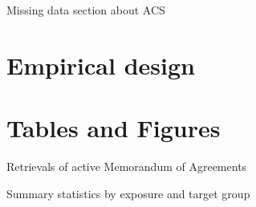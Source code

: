 \documentclass{article}
\begin{document}
Missing data section about ACS

\section{Empirical design}

\begin{comment}

in migration: previous year is different from the current year
\begin{equation}
    in-migration_{icy} = \beta_{0} + \beta_{1}exposure_{cy}*targeted_{i} +  \beta_{2}exposure_{cy} + \beta_{3}targeted_{i} + \beta_{42}W_{y} + \beta_{53}Z_{c} + \epsilon_{cy} 
\end{equation}

out migration 
\begin{equation}
    out-migration_{ic'y'} = \beta'_{0} + \beta'_{1}exposure_{c'y'}*targeted_{i} + \beta'_{2}exposure_{c'y'} + \beta'_{3}targeted_{i} + \beta'_{42}W_{y'} + \beta'_{43}Z_{c'} + \epsilon_{c'y'} 
\end{equation}
\end{comment}

\newpage


\newpage
\section{Tables and Figures}

\begin{table}[H]
\centering
\caption{Retrievals of active Memorandum of Agreements}
\label{tab:retrievals}
\end{table}

\newpage
\begin{table}[H]
\centering
\caption{Summary statistics by exposure and target group}
\label{tab:retrievals}
\end{table}
\end{document}
